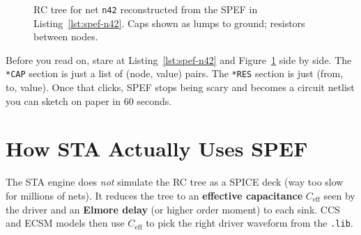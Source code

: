 \begin{figure}[h]
\centering
{}
\caption{RC tree for net \texttt{n42} reconstructed from the SPEF in Listing~\ref{lst:spef-n42}. Caps shown as lumps to ground; resistors between nodes.}
\label{fig:rc-tree}
\end{figure}

\begin{pausebox}
Before you read on, stare at Listing~\ref{lst:spef-n42} and Figure~\ref{fig:rc-tree} side by side. The \texttt{*CAP} section is just a list of (node, value) pairs. The \texttt{*RES} section is just (from, to, value). Once that clicks, SPEF stops being scary and becomes a circuit netlist you can sketch on paper in 60 seconds.
\end{pausebox}

\section{How STA Actually Uses SPEF}

The STA engine does \emph{not} simulate the RC tree as a SPICE deck (way too slow for millions of nets). It reduces the tree to an \textbf{effective capacitance} $C_{\text{eff}}$ seen by the driver and an \textbf{Elmore delay} (or higher order moment) to each sink. CCS and ECSM models then use $C_{\text{eff}}$ to pick the right driver waveform from the \texttt{.lib}.

